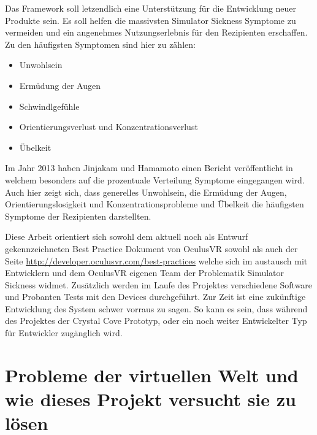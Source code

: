 \documentclass[pagesize, paper=a4, fontsize=12pt,titlepage=true, headings=small, headnosepline, abstractoff, liststotoc, nochapterprefix, plainheadsepline]{scrreprt}
\begin{document}
Das Framework soll letzendlich eine Unterstützung für die Entwicklung neuer Produkte sein. Es soll helfen die massivsten Simulator Sickness Symptome zu vermeiden und ein angenehmes Nutzungserlebnis für den Rezipienten erschaffen. Zu den häufigsten Symptomen sind hier zu zählen:
\begin{itemize}
\item Unwohlsein
\item Ermüdung der Augen
\item Schwindlgefühle
\item Orientierungsverlust und Konzentrationsverlust
\item Übelkeit
\end{itemize}

Im Jahr 2013 haben Jinjakam und Hamamoto einen Bericht veröffentlicht \cite{JinjakamHamamoto2012} in welchem besonders auf die prozentuale Verteilung Symptome eingegangen wird. Auch hier zeigt sich, dass generelles Unwohlsein, die Ermüdung der Augen, Orientierungslosigkeit und Konzentrationsprobleme und Übelkeit die häufigsten Symptome der Rezipienten darstellten.

Diese Arbeit orientiert sich sowohl dem aktuell noch als Entwurf gekennzeichneten Best Practice Dokument von OculusVR sowohl als auch der Seite \url{http://developer.oculusvr.com/best-practices} welche sich im austausch mit Entwicklern und dem OculusVR eigenen Team der Problematik Simulator Sickness widmet. Zusätzlich werden im Laufe des Projektes verschiedene Software und Probanten Tests mit den Devices durchgeführt. Zur Zeit ist eine zukünftige Entwicklung des System schwer vorraus zu sagen. So kann es sein, dass während des Projektes der Crystal Cove Prototyp, oder ein noch weiter Entwickelter Typ für Entwickler zugänglich wird.




\chapter{Probleme der virtuellen Welt und wie dieses Projekt versucht sie zu lösen}
\end{document}
